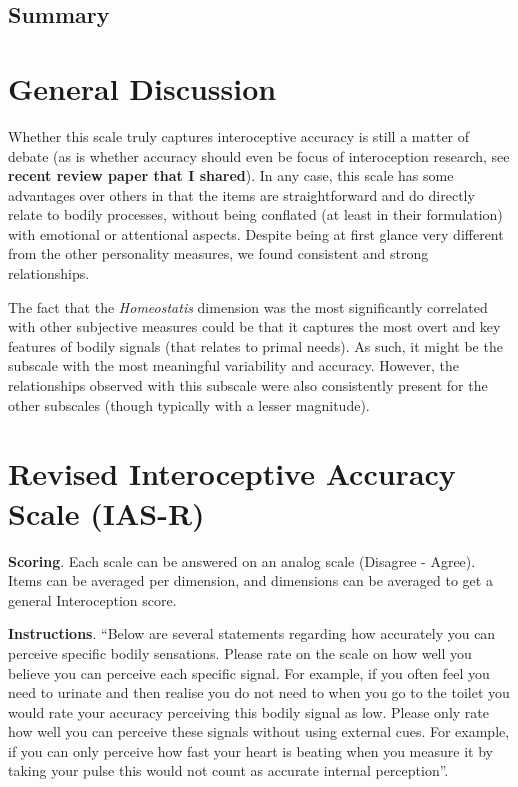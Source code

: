 \documentclass[
  man,floatsintext]{apa6}
\begin{document}
\hypertarget{summary-1}{%
\subsection{Summary}\label{summary-1}}

\hypertarget{general-discussion}{%
\section{General Discussion}\label{general-discussion}}

Whether this scale truly captures interoceptive accuracy is still a matter of debate (as is whether accuracy should even be focus of interoception research, see \textbf{recent review paper that I shared}). In any case, this scale has some advantages over others in that the items are straightforward and do directly relate to bodily processes, without being conflated (at least in their formulation) with emotional or attentional aspects. Despite being at first glance very different from the other personality measures, we found consistent and strong relationships.

The fact that the \emph{Homeostatis} dimension was the most significantly correlated with other subjective measures could be that it captures the most overt and key features of bodily signals (that relates to primal needs). As such, it might be the subscale with the most meaningful variability and accuracy. However, the relationships observed with this subscale were also consistently present for the other subscales (though typically with a lesser magnitude).

\newpage

\hypertarget{revised-interoceptive-accuracy-scale-ias-r}{%
\section{Revised Interoceptive Accuracy Scale (IAS-R)}\label{revised-interoceptive-accuracy-scale-ias-r}}

\textbf{Scoring}. Each scale can be answered on an analog scale (Disagree - Agree). Items can be averaged per dimension, and dimensions can be averaged to get a general Interoception score.

\textbf{Instructions}. ``Below are several statements regarding how accurately you can perceive specific bodily sensations. Please rate on the scale on how well you believe you can perceive each specific signal. For example, if you often feel you need to urinate and then realise you do not need to when you go to the toilet you would rate your accuracy perceiving this bodily signal as low. Please only rate how well you can perceive these signals without using external cues. For example, if you can only perceive how fast your heart is beating when you measure it by taking your pulse this would not count as accurate internal perception''.
\end{document}
